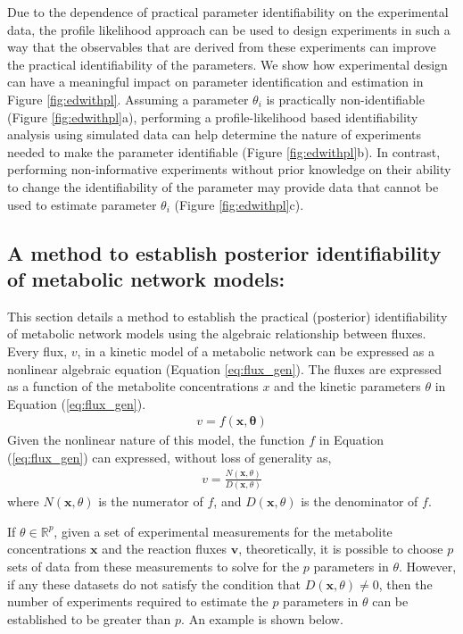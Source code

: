 \documentclass[10pt]{article}
\begin{document}
	Due to the dependence of practical parameter identifiability on the experimental data, the profile likelihood approach can be used to design experiments in such a way that the observables that are derived from these experiments can improve the practical identifiability of the parameters. We show how experimental design can have a meaningful impact on parameter identification and estimation in Figure \ref{fig:edwithpl}.	Assuming a parameter $\theta_i$ is practically non-identifiable (Figure \ref{fig:edwithpl}a), performing a profile-likelihood based identifiability analysis using simulated data can help determine the nature of experiments needed to make the parameter identifiable (Figure \ref{fig:edwithpl}b). In contrast, performing non-informative experiments without prior knowledge on their ability to change the identifiability of the parameter may provide data that cannot be used to estimate parameter $\theta_i$ (Figure \ref{fig:edwithpl}c).	
	
	\subsection{A method to establish posterior identifiability of metabolic network models:}
	This section details a method to establish the practical (posterior) identifiability of metabolic network models using the algebraic relationship between fluxes.
	Every flux, $v$, in a kinetic model of a metabolic network can be expressed as a nonlinear algebraic equation (Equation \ref{eq:flux_gen}). The fluxes are expressed as a function of the metabolite concentrations $x$ and the kinetic parameters $\theta$ in Equation (\ref{eq:flux_gen}).
	\begin{align}\label{eq:flux_gen}
		v = f(\mathbf{x},\mathbf{\theta})
	\end{align}
	Given the nonlinear nature of this model, the function $f$ in Equation (\ref{eq:flux_gen}) can expressed, without loss of generality as,
	\begin{align}\label{eq:nr_dr}
		v = \frac{N(\mathbf{x},\theta)}{D(\mathbf{x},\theta)}
	\end{align}
	where $N(\mathbf{x},\theta)$ is the numerator of $f$, and $D(\mathbf{x},\theta)$ is the denominator of $f$.
	
	If $\theta \in \mathbb{R}^p$, given a set of experimental measurements for the metabolite concentrations $\mathbf{x}$ and the reaction fluxes $\mathbf{v}$, theoretically, it is possible to choose $p$ sets of data from these measurements to solve for the $p$ parameters in $\theta$. However, if any these datasets do not satisfy the condition that $D(\mathbf{x},\theta) \neq 0$, then the number of experiments required to estimate the $p$ parameters in $\theta$ can be established to be greater than $p$. An example is shown below.
	
\end{document}

